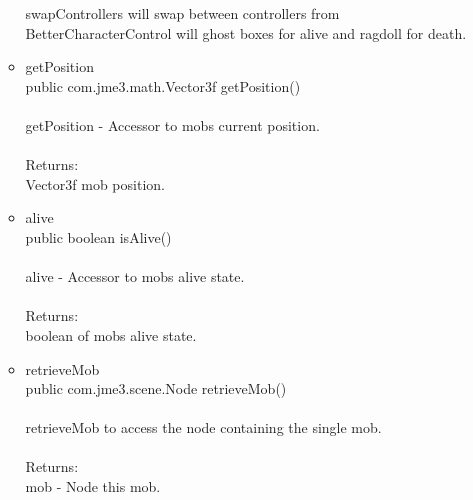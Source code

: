 \documentclass[letterpaper]{article}
\begin{document}
\begin{itemize}
\begin{itemize}
													swapControllers will swap between controllers from BetterCharacterControl will ghost boxes for alive and ragdoll for death. \\
											\item	getPosition \\
													public com.jme3.math.Vector3f getPosition() \\ \\
													getPosition - Accessor to mobs current position. \\ \\
													Returns: \\
													Vector3f mob position.
											\item	alive \\
													public boolean isAlive() \\ \\
													alive - Accessor to mobs alive state. \\ \\
													Returns: \\
													boolean of mobs alive state. \\
											\item	retrieveMob \\
													public com.jme3.scene.Node retrieveMob() \\ \\
													retrieveMob to access the node containing the single mob. \\ \\
													Returns: \\
													mob - Node this mob.
										\end{itemize}
							\end{itemize}
							
						\vspace{0.2in}
\end{document}
